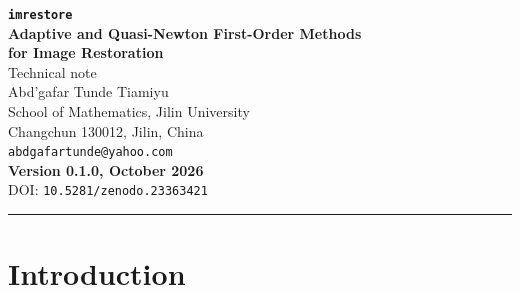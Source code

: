 \documentclass[11pt,a4paper]{article}
\newcommand{\seprule}{\vspace{4pt}\noindent\rule{\textwidth}{0.5pt}\vspace{4pt}}
\newcommand{\code}[1]{\texttt{#1}}
\begin{document}
\sloppy

\begin{center}
{\LARGE\bfseries\texttt{imrestore}}\\[6pt]
{\Large\bfseries Adaptive and Quasi-Newton First-Order Methods\\[2pt]
 for Image Restoration}\\[10pt]
{\large Technical note}\\[10pt]
{\large Abd'gafar Tunde Tiamiyu}\\[4pt]
{\small School of Mathematics, Jilin University\\[2pt]
 Changchun 130012, Jilin, China}\\[4pt]
{\small\texttt{abdgafartunde@yahoo.com}}\\[12pt]
{\small\bfseries Version 0.1.0, October 2026}\\[4pt]
{\small DOI: \texttt{10.5281/zenodo.23363421}}\\[4pt]
\seprule
\end{center}

\renewcommand{\abstractname}{Summary}
\begin{abstract}
\noindent
\texttt{imrestore} is an open-source Python package of first-order
optimization methods that need no hand-tuned step size, applied to image
denoising and deblurring. It implements adaptive gradient descent
(AdGD)~\cite{MalitskyMishchenko2020}, inertial quasi-Newton forward-backward
splitting (QN-FBS) with a rank-one metric~\cite{WangFadiliOchs2022}, and the
primal-dual algorithm with linesearch (PDAL)~\cite{MalitskyPock2018} with its
variable-metric extension (VarPDAL)~\cite{WangFadiliOchs2024}, together with
a Gaussian-blur operator, a total-variation operator, proximal maps, and
image-quality metrics. All methods are independent reimplementations from the
papers. This note states the problems each method solves, gives the
algorithms as implemented with their parameters and stopping rules, reports
the verification and restoration results, gives guidance on choosing the
parameters, and states the limitations. A step-by-step tutorial is provided
separately as \code{examples/00\_getting\_started.ipynb}.
\end{abstract}

\tableofcontents

\section{Introduction}
\end{document}
